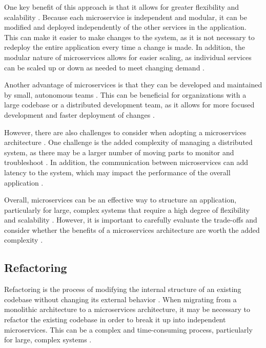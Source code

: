 \documentclass[conference]{IEEEtran}
\begin{document}
One key benefit of this approach is that it allows for greater flexibility and
scalability \cite{newman2019monolith}. Because each microservice is independent
and modular, it can be modified and deployed independently of the other
services in the application. This can make it easier to make changes to the
system, as it is not necessary to redeploy the entire application every time a
change is made. In addition, the modular nature of microservices allows for
easier scaling, as individual services can be scaled up or down as needed to
meet changing demand
\cite{newman2019monolith}\cite{newman2021building}\cite{fowler-microservices}.

Another advantage of microservices is that they can be developed and maintained
by small, autonomous teams \cite{chen2018microservices}. This can be beneficial
for organizations with a large codebase or a distributed development team, as
it allows for more focused development and faster deployment of changes
\cite{nadareishvili2016microservice}.

However, there are also challenges to consider when adopting a microservices
architecture \cite{fowler-microservices-tradeoffs}. One challenge is the added
complexity of managing a distributed system, as there may be a larger number of
moving parts to monitor and troubleshoot \cite{newman2021building}. In
addition, the communication between microservices can add latency to the
system, which may impact the performance of the overall application
\cite{fowler-microservices-tradeoffs} \cite{pautasso2017microservices}.

Overall, microservices can be an effective way to structure an application,
particularly for large, complex systems that require a high degree of
flexibility and scalability \cite{newman2021building}. However, it is important
to carefully evaluate the trade-offs and consider whether the benefits of a
microservices architecture are worth the added complexity
\cite{fowler-microservices-tradeoffs}.

\subsection{Refactoring}

Refactoring is the process of modifying the internal structure of an existing
codebase without changing its external behavior \cite{becker1999refactoring}.
When migrating from a monolithic architecture to a microservices architecture,
it may be necessary to refactor the existing codebase in order to break it up
into independent microservices. This can be a complex and time-consuming
process, particularly for large, complex systems \cite{newman2019monolith}.
\end{document}
